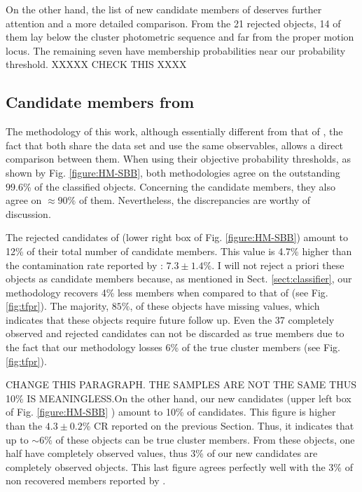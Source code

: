 On the other hand, the list of new candidate members of \citet{Stauffer2007} deserves further attention and a more detailed comparison.
From the 21 rejected objects, 14 of them lay below the cluster photometric sequence and  far from the proper motion locus. The remaining seven have membership probabilities near our probability threshold. XXXXX CHECK THIS XXXX 
\subsection{Candidate members from \citet{Bouy2015}}
\label{sect:comparisonBouy}
The methodology of this work, although essentially different from that of \citet{Bouy2015}, the fact that both share the data set and use the same observables, allows a direct comparison between them. When using their objective probability thresholds, as shown by Fig. \ref{figure:HM-SBB}, both methodologies agree on the outstanding $99.6$\% of the classified objects. Concerning the candidate members, they also agree on $\approx 90\%$ of them. Nevertheless, the discrepancies are worthy of discussion.

The rejected candidates of \citet{Bouy2015} (lower right box of Fig. \ref{figure:HM-SBB}) amount to 12\% of their total number of candidate members. This value is 4.7\% higher than the contamination rate reported by \citet{Sarro2014}: $7.3\pm1.4$\%. I will not reject a priori these objects as candidate members because, as mentioned in Sect. \ref{sect:classifier}, our methodology recovers 4\% less members when compared to that of \citet{Sarro2014}(see Fig. \ref{fig:tfpr}). The majority, $85\%$, of these objects have missing values, which indicates that these objects require future follow up. Even the 37 completely observed and rejected candidates can not be discarded as true members due to the fact that our methodology losses 6\% of the true cluster members (see Fig. \ref{fig:tfpr}).  

CHANGE THIS PARAGRAPH. THE SAMPLES ARE NOT THE SAME THUS 10\% IS MEANINGLESS.On the other hand, our new candidates (upper left box of Fig. \ref{figure:HM-SBB} ) amount to 10\% of \citet{Bouy2015} candidates. This figure is higher than the $4.3\pm0.2$\% CR reported on the previous Section. Thus, it indicates that up to $\sim6\%$ of these objects can be true cluster members. From these objects, one half have completely observed values, thus 3\% of our new candidates are completely observed objects. This last figure agrees perfectly well with the 3\% of non recovered members reported by \citet{Sarro2014}. 

